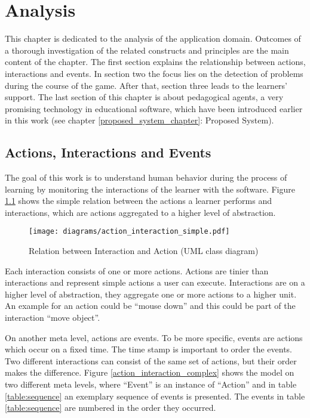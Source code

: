 \chapter{Analysis}


This chapter is dedicated to the analysis of the application domain. Outcomes of a
thorough investigation of the related constructs and principles are the main
content of the chapter. The first section explains the relationship between
actions, interactions and events. In section two the focus lies on the
detection of problems during the course of the game. After that, section three
leads to the learners' support. The last section of this chapter is about
pedagogical agents, a very promising technology in educational software, which have been
introduced earlier in this work (see chapter \ref{proposed_system_chapter}: Proposed System).

\section{Actions, Interactions and Events}
The goal of this work is to understand human behavior during the process of learning by
monitoring the interactions of the learner with the software. Figure
\ref{action_interaction_simple} shows the simple relation between the actions a learner
performs and interactions, which are actions aggregated to a higher level of abstraction.

\begin{figure}
    \centering
    \texttt{[image: diagrams/action\_interaction\_simple.pdf]}
    \caption[Relation between Interaction and Action (UML class diagram)]
    {Relation between Interaction and Action (UML class diagram)}
    \label{action_interaction_simple}
\end{figure}

Each interaction consists of one or more actions. Actions are tinier than
interactions and represent simple actions a user can execute. Interactions are
on a higher level of abstraction, they aggregate one or more actions to a
higher unit. An example for an action could be ``mouse down'' and this could be
part of the interaction ``move object''.

On another meta level, actions are events. To be more specific, events are
actions which occur on a fixed time. The time stamp is important to order the
events. Two different interactions can consist of the same set of actions, but
their order makes the difference. Figure \ref{action_interaction_complex}
shows the model on two different meta levels, where ``Event'' is an instance of
``Action'' and in table \ref{table:sequence} an exemplary sequence of events is
presented. The events in table \ref{table:sequence} are numbered in the order they
occurred.

